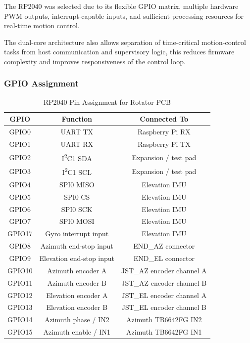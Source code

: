 The RP2040 was selected due to its flexible GPIO matrix, multiple hardware PWM outputs, interrupt-capable inputs, and sufficient processing resources for real-time motion control. 

The dual-core architecture also allows separation of time-critical motion-control tasks from host communication and supervisory logic, this reduces firmware complexity and improves responsiveness of the control loop.

\subsubsection{GPIO Assignment}
\label{subsubsec:rotator_gpio}

\begin{table}[H]
\centering
\caption{RP2040 Pin Assignment for Rotator PCB}
\begin{tabular}{|c|c|c|}
\hline
\textbf{GPIO} & \textbf{Function} & \textbf{Connected To} \\
\hline
GPIO0  & UART TX & Raspberry Pi RX \\
GPIO1  & UART RX & Raspberry Pi TX \\
\hline
GPIO2  & I\textsuperscript{2}C1 SDA & Expansion / test pad \\
GPIO3  & I\textsuperscript{2}C1 SCL & Expansion / test pad \\
\hline
GPIO4  & SPI0 MISO & Elevation IMU \\
GPIO5  & SPI0 CS   & Elevation IMU \\
GPIO6  & SPI0 SCK  & Elevation IMU \\
GPIO7  & SPI0 MOSI & Elevation IMU \\
GPIO17 & Gyro interrupt input & Elevation IMU \\
\hline
GPIO8  & Azimuth end-stop input   & END\_AZ connector \\
GPIO9  & Elevation end-stop input & END\_EL connector \\
\hline
GPIO10 & Azimuth encoder A & JST\_AZ encoder channel A \\
GPIO11 & Azimuth encoder B & JST\_AZ encoder channel B \\
GPIO12 & Elevation encoder A & JST\_EL encoder channel A \\
GPIO13 & Elevation encoder B & JST\_EL encoder channel B \\
\hline
GPIO14 & Azimuth phase / IN2 & Azimuth TB6642FG IN2 \\
GPIO15 & Azimuth enable / IN1 & Azimuth TB6642FG IN1 \\

\end{tabular}
\end{table}
